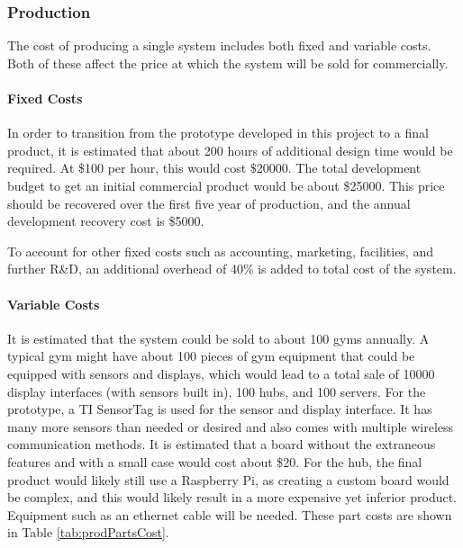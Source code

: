 \documentclass[PPFS.tex]{template/subfiles}
\begin{document}
        \subsubsection{Production}
        The cost of producing a single system includes both fixed and variable costs. Both of these affect the price at which the system will be sold for commercially.
        
        \paragraph{Fixed Costs}	
        In order to transition from the prototype developed in this project to a final product, it is estimated that about 200 hours of additional design time would be required. At \$100 per hour, this would cost \$20000. The total development budget to get an initial commercial product would be about \$25000. This price should be recovered over the first five year of production, and the annual development recovery cost is \$5000.
        
        To account for other fixed costs such as accounting, marketing, facilities, and further R\&D, an additional overhead of 40\% is added to total cost of the system.
        
        \paragraph{Variable Costs}
        
        It is estimated that the system could be sold to about 100 gyms annually. A typical gym might have about 100 pieces of gym equipment that could be equipped with sensors and displays, which would lead to a total sale of 10000 display interfaces (with sensors built in), 100 hubs, and 100 servers. 
        For the prototype, a TI SensorTag is used for the sensor and display interface. It has many more sensors than needed or desired and also comes with multiple wireless communication methods. It is estimated that a board without the extraneous features and with a small case would cost about \$20.
        For the hub, the final product would likely still use a Raspberry Pi, as creating a custom board would be complex, and this would likely result in a more expensive yet inferior product. Equipment such as an ethernet cable will be needed.
        These part costs are shown in Table \ref{tab:prodPartsCost}.
        
\end{document}
